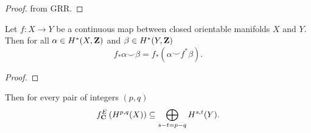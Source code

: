 \begin{proof}
    from GRR.
\end{proof}

\begin{proposition}
    \label{cohomological projection formula}
    Let $f \colon X \to Y$ be a continuous map between closed orientable manifolds $X$ and $Y$. Then for all $\alpha \in H^{*}(X, \mathbf Z)$ and $\beta \in H^{*}(Y, \mathbf Z)$
    \[
        f_*\alpha \smallsmile \beta = f_*(\alpha \smallsmile f^*\beta).
    \]
\end{proposition}

\begin{proof}
    
\end{proof}

\begin{proposition}
    \label{Hodge lattice, fm transform interaction}
    Then for every pair of integers $(p,q)$
    \begin{equation}
        \label{eq: Hodge lattice, fm transform}
        f^{E}_\mathbf C\left(H^{p,q}(X)\right) \subseteq \bigoplus_{s - t = p - q} H^{s,t}(Y).
    \end{equation}
\end{proposition}